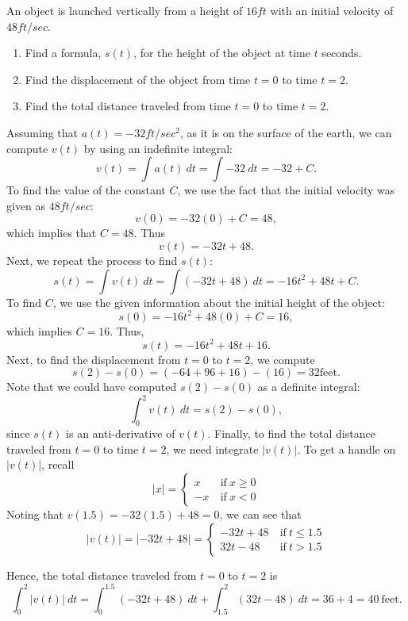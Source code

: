 \documentclass{ximera}
\begin{document}
\begin{example}
An object is launched vertically from a height of $16 ft$ with an initial velocity of $48 ft/sec$.  
\begin{enumerate}
\item Find a formula, $s(t)$, for the height of the object at time $t$
 seconds.
\item Find the displacement of the object from time $t = 0$ to time $t = 2$.
\item Find the total distance traveled from time $t = 0$ to time $t = 2$.
\end{enumerate}

Assuming that $a(t) = -32 ft/sec^2$, as it is on the surface of the earth, 
we can compute $v(t)$ by using an indefinite integral:
\[v(t) = \int a(t) \ dt = \int -32 \ dt = -32 + C.\]
To find the value of the constant $C$, we use the fact that the initial velocity was given as $48 ft/sec$:
\[v(0) = -32(0) + C = 48,\]
which implies that $C = 48$.  Thus
\[v(t) = -32t + 48.\]
Next, we repeat the process to find $s(t)$:
\[s(t) = \int v(t) \ dt = \int (-32t + 48) \ dt = -16t^2 + 48t + C.\]
To find $C$, we use the given information about the initial height of the object:
\[s(0) = -16t^2 + 48(0) + C = 16,\]
which implies $C = 16$.  Thus,
\[s(t) = -16t^2 + 48t + 16.\]
Next, to find the displacement from $t= 0$ to $t = 2$, we compute
\[s(2) - s(0) = (-64+96+16)-(16) = 32 \text{feet}.\]
Note that we could have computed $s(2) - s(0)$ as a definite integral:
\[\int_0^2 v(t) \ dt = s(2) - s(0),\]
since $s(t)$ is an anti-derivative of $v(t)$.
Finally, to find the total distance traveled from $t = 0$ to time $t = 2$,
we need integrate $|v(t)|$. To get a handle on $|v(t)|$, recall
\[|x| = \left\{
     \begin{array}{rc}
       x & \ \text{if} \  x \geq 0 \\
			 -x & \ \text{if} \ x <0
     \end{array}
   \right.
\]
Noting that $v(1.5) = -32(1.5) + 48 = 0$, we can see that
\[|v(t)| = |-32t + 48| = \left\{\begin{array}{rc}
       -32t + 48  &\ \text{if} \  t \leq 1.5 \\
			 32t - 48  &\ \text{if} \ t > 1.5
     \end{array}
   \right.
\]


Hence, the total distance traveled from $t=0$ to $t = 2$ is
\[\int_0^2 |v(t)| \ dt = \int_0^{1.5} (-32t + 48) \ dt + \int_{1.5}^2 (32t -48) \ dt = 36 + 4 = 40 \ \text{feet}.\]


\end{example}
\end{document}
